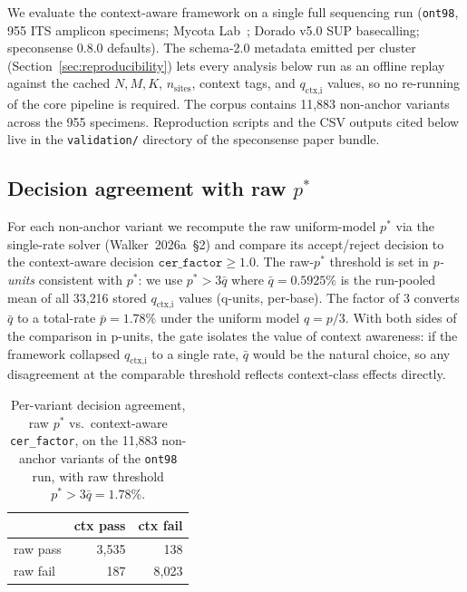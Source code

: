 \documentclass[11pt]{article}
\begin{document}
We evaluate the context-aware framework on a single full sequencing run
(\texttt{ont98}, 955 ITS amplicon specimens; Mycota Lab~\cite{russell2023};
Dorado v5.0 SUP basecalling; speconsense 0.8.0 defaults). The schema-2.0
metadata emitted per cluster (Section~\ref{sec:reproducibility}) lets every
analysis below run as an offline replay against the cached
$N, M, K$, $n_\text{sites}$, context tags, and $q_\text{ctx,i}$ values, so no
re-running of the core pipeline is required. The corpus contains
11{,}883 non-anchor variants across the 955 specimens. Reproduction scripts
and the CSV outputs cited below live in the \texttt{validation/} directory
of the speconsense paper bundle.

\subsection{Decision agreement with raw $p^*$}
\label{sec:val_b1}

For each non-anchor variant we recompute the raw uniform-model $p^*$ via the
single-rate solver (Walker~2026a~\S 2) and compare its accept/reject decision
to the context-aware decision $\texttt{cer\_factor} \geq 1.0$. The raw-$p^*$
threshold is set in \emph{p-units} consistent with $p^*$: we use $p^* > 3\bar{q}$
where $\bar{q} = 0.5925\%$ is the run-pooled mean of all 33{,}216 stored
$q_\text{ctx,i}$ values (q-units, per-base). The factor of 3 converts $\bar{q}$
to a total-rate $\bar{p} = 1.78\%$ under the uniform model $q = p/3$. With both
sides of the comparison in p-units, the gate isolates the value of context
awareness: if the framework collapsed $q_\text{ctx,i}$ to a single rate,
$\bar{q}$ would be the natural choice, so any disagreement at the comparable
threshold reflects context-class effects directly.

\begin{table}[h]
\centering
\caption{Per-variant decision agreement, raw $p^*$ vs.\ context-aware
\texttt{cer\_factor}, on the 11{,}883 non-anchor variants of the
\texttt{ont98} run, with raw threshold $p^* > 3\bar{q} = 1.78\%$.}
\label{tab:val_decisions}
\begin{tabular}{l r r}
\toprule
                & ctx pass & ctx fail \\
\midrule
raw pass        & 3{,}535  & 138 \\
raw fail        & 187      & 8{,}023 \\
\bottomrule
\end{tabular}
\end{table}
\end{document}
